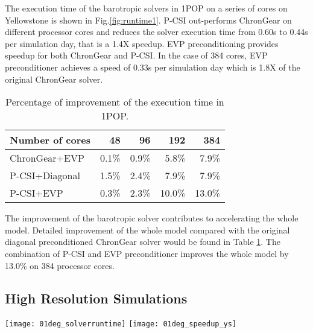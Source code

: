 The execution time of the barotropic solvers in 1\degree POP on a series of cores on Yellowstone is shown in Fig.\ref{fig:runtime1}. 
P-CSI out-performs ChronGear on different processor cores and reduces the solver execution time from 0.60s to 0.44s per simulation day, that is a 1.4X speedup. 
EVP preconditioning provides speedup for both ChronGear and P-CSI. In the case of 384 cores, EVP preconditioner achieves a speed of 0.33s per simulation day which is 1.8X of the original ChronGear solver. 

\begin{table}[!t]
\centering
\caption{Percentage of improvement of the execution time in 1\degree POP. \label{tab:improve_1}}
\begin{tabular}{|l||r|r|r|r|}
\hline
Number of cores & 48  & 96  & 192& 384 \\\hline
\hline
ChronGear+EVP &0.1\% &0.9\%	&5.8\%&7.9\% \\\hline
P-CSI+Diagonal  & 1.5\% &2.4\%&7.9\%  &7.9\% \\\hline
P-CSI+EVP	      &0.3\%& 2.3\%	&10.0\%  &13.0\% \\\hline
\end{tabular}
\end{table}
The improvement of the barotropic solver contributes to accelerating the whole model. 
Detailed improvement of the whole model compared with the original diagonal preconditioned ChronGear solver would be found in Table \ref{tab:improve_1}. The combination of P-CSI and EVP preconditioner improves the whole model by 13.0\% on 384 processor cores. 

\subsection{High Resolution Simulations}
\begin {figure*}[t!]
\begin{center}
\texttt{[image: 01deg\_solverruntime]}
\hspace{10pt}
\texttt{[image: 01deg\_speedup\_ys]}
\end{center}
\caption []{Execution time of barotropic solvers in the 0.1\degree POP for one day on Yellowstone (left). 
The relative speedup of the whole POP model referred to the original configuration with a diagonal preconditioned ChronGear solver on 470 cores on Yellowstone (right).\label {fig:runtime01}}
\end {figure*}

